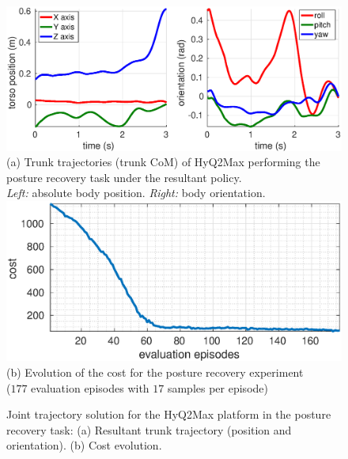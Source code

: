 \documentclass[usletter, 10pt, conference]{ieeeconf}      %
\begin{document}
\begin{figure}[h!]
 \centering
 \hspace*{-7mm}
 \includegraphics[scale=.37]{sr_solution_1_ICRA.eps} \\
 \small
  (a) Trunk trajectories (trunk CoM) of HyQ2Max performing the posture recovery task under the resultant policy. \\
  \textit{Left:} absolute body position.  \textit{Right:} body orientation.
  \includegraphics[scale=.45]{sr_cost_1_ICRA.eps}\\
  (b) Evolution of the cost for the posture recovery experiment\\ ($177$ evaluation episodes with $17$ samples per episode)
  \normalsize
  \caption{Joint trajectory solution for the HyQ2Max platform in the posture recovery task: 
  (a) Resultant trunk trajectory (position and orientation). (b) Cost evolution.}
     \vspace*{-4mm}
  \label{fig:poseRec}
\end{figure}
\end{document}
